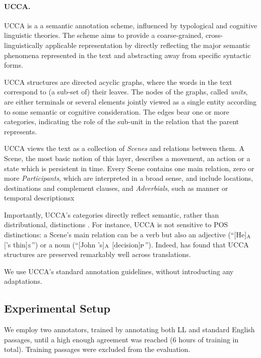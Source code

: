 \documentclass[letter,11pt]{article}
\begin{document}
{\paragraph{UCCA.}\label{sec:ucca}
UCCA is a a semantic annotation scheme, influenced
by typological and cognitive linguistic theories.
The scheme aims to provide a coarse-grained, cross-linguistically
applicable representation by directly reflecting the major semantic
phenomena represented in the text and abstracting away from
specific syntactic forms.

UCCA structures are directed acyclic graphs, where the words in the text 
correspond to (a sub-set of) their leaves.
The nodes of the graphs, called {\it units}, are either terminals or several elements jointly
viewed as a single entity according to some semantic  or cognitive consideration.
The edges bear one or more categories, indicating the role of 
the sub-unit in the relation that the parent represents.%

UCCA views the text as a collection of {\it Scenes} and relations between them.
A Scene, the most basic notion of this layer, describes a movement, 
an action or a state which is persistent in time.
Every Scene contains one main relation, 
zero or more {\it Participants}, 
which are interpreted in a broad sense, 
and include locations, destinations and complement clauses,
and {\it Adverbials}, such as manner or temporal descriptionsx

Importantly, UCCA's categories directly reflect semantic, rather than distributional, distinctions .
For instance, UCCA is not sensitive to POS distinctions: a Scene's main relation can be a verb but also an adjective
(``[He]${\rm_{A}}$ ['s thin]${\rm_{S}}$'') or 
a noun (``[John 's]${\rm_{A}}$ [decision]${\rm_{P}}$'').
Indeed,  has found
that UCCA structures are preserved remarkably well across translations.

We use UCCA's standard annotation guidelines, without introducting any adaptations.

\subsection{Experimental Setup}

We employ two annotators, trained by annotating both LL and standard English
passages, until a high enough agreement was reached (6 hours of training in total).
Training passages were excluded from the evaluation.

}
\end{document}
